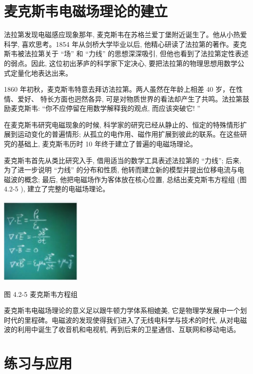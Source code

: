 \documentclass[10pt]{article}
\begin{document}
\section*{麦克斯韦电磁场理论的建立}

法拉第发现电磁感应现象那年, 麦克斯韦在苏格兰爱丁堡附近诞生了。他从小热爱科学, 喜欢思考。1854 年从剑桥大学毕业以后, 他精心研读了法拉第的著作。麦克斯韦被法拉第关于 “场” 和 “力线” 的思想深深吸引, 但他也看到了法拉第定性表述的弱点。因此, 这位初出茅庐的科学家下定决心, 要把法拉第的物理思想用数学公式定量化地表达出来。

1860 年初秋，麦克斯韦特意去拜访法拉第。两人虽然在年龄上相差 40 岁，在性情、爱好、 特长方面也迥然各异, 可是对物质世界的看法却产生了共鸣。法拉第鼓励麦克斯韦: “你不应停留在用数学解释我的观点, 而应该突破它! ”

在麦克斯韦研究电磁现象的时候, 科学家的研究已经从静止的、恒定的特殊情形扩展到运动变化的普遍情形; 从孤立的电作用、磁作用扩展到彼此的联系。在这些研究的基础上, 麦克斯韦历时 10 年终于建立了普遍的电磁场理论。

麦克斯韦首先从类比研究入手, 借用适当的数学工具表述法拉第的 “力线”; 后来, 为了进一步说明 “力线” 的分布和性质, 他转而建立新的模型并提出位移电流与电磁波的概念; 最后, 他把电磁场作为客体放在核心位置, 总结出麦克斯韦方程组 (图 4.2-5 ), 建立了完整的电磁场理论。

\begin{center}
\includegraphics[max width=0.3\textwidth]{images/01910e72-c5b7-7ed5-a6d4-fb3a5faefc32_84_974787.jpg}
\end{center}

图 4.2-5 麦克斯韦方程组

麦克斯韦电磁场理论的意义足以跟牛顿力学体系相媲美, 它是物理学发展中一个划时代的里程碑。电磁波的发现使得我们进入了无线电科学与技术的时代, 从对电磁波的利用中诞生了收音机和电视机, 再到后来的卫星通信、互联网和移动电话。

\section*{练习与应用}
\end{document}
